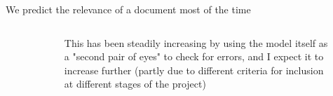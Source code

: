 \documentclass[9pt]{beamer}
\begin{document}
\begin{frame}{We predict the relevance of a document most of the time}
\begin{figure}
\begin{columns}
\begin{column}{0.3812\linewidth}
\begin{figure}
			\end{figure}
		\end{column}
		\begin{column}{0.5\linewidth}
			This has been steadily increasing by using the model itself as a "second pair of eyes" to check for errors, and I expect it to increase further (partly due to different criteria for inclusion at different stages of the project)
		\end{column}
	\end{columns}

\end{figure}
\end{frame}
\end{document}
